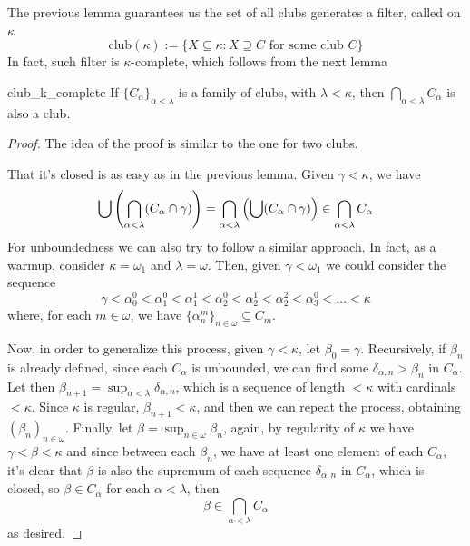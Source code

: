 The previous lemma guarantees us the set of all clubs generates a filter, called  on $\kappa$
\begin{equation}\label{eq:club_filter}
    \mathrm{club}(\kappa):=\{X\subseteq\kappa:X\supseteq C\text{ for some club }C\}
\end{equation}
In fact, such filter is $\kappa$-complete, which follows from the next lemma

\begin{lemma}{}{club_k_complete}
    If $\{C_\alpha\}_{\alpha<\lambda}$ is a family of clubs, with $\lambda<\kappa$, then $\bigcap_{\alpha<\lambda}C_\alpha$ is also a club.
\end{lemma}

\begin{proof}
    The idea of the proof is similar to the one for two clubs.
    
    That it's closed is as easy as in the previous lemma. Given $\gamma<\kappa$, we have
    $$\bigcup{\left(\bigcap_{\alpha<\lambda}(C_\alpha\cap\gamma)\right)}=\bigcap_{\alpha<\lambda}{\left(\bigcup(C_\alpha\cap\gamma)\right)}\in\bigcap_{\alpha<\lambda}C_\alpha$$
    For unboundedness we can also try to follow a similar approach. In fact, as a warmup, consider $\kappa=\omega_1$ and $\lambda=\omega$. Then, given $\gamma<\omega_1$ we could consider the sequence
    $$\gamma<\alpha_0^0<\alpha_1^0<\alpha_1^1<\alpha_2^0<\alpha_2^1<\alpha_2^2<\alpha_3^0<\dots<\kappa$$
    where, for each $m\in\omega$, we have $\{\alpha_n^m\}_{n\in\omega}\subseteq C_m$.

    Now, in order to generalize this process, given $\gamma<\kappa$, let $\beta_0=\gamma$. Recursively, if $\beta_n$ is already defined, since each $C_\alpha$ is unbounded, we can find some $\delta_{\alpha,n}>\beta_n$ in $C_\alpha$. Let then $\beta_{n+1}=\sup_{\alpha<\lambda}\delta_{\alpha,n}$, which is a sequence of length $<\!\kappa$ with cardinals $<\!\kappa$. Since $\kappa$ is regular, $\beta_{n+1}<\kappa$, and then we can repeat the process, obtaining $(\beta_n)_{n\in\omega}$. Finally, let $\beta=\sup_{n\in\omega}\beta_n$, again, by regularity of $\kappa$ we have $\gamma<\beta<\kappa$ and since between each $\beta_n$, we have at least one element of each $C_\alpha$, it's clear that $\beta$ is also the supremum of each sequence $\delta_{\alpha,n}$ in $C_\alpha$, which is closed, so $\beta\in C_\alpha$ for each $\alpha<\lambda$, then
    $$\beta\in\bigcap_{\alpha<\lambda}C_\alpha$$
    as desired.
\end{proof}

